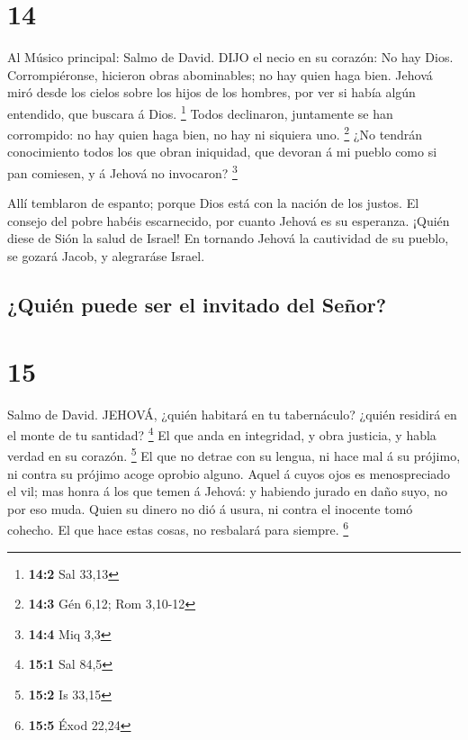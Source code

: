 \hypertarget{section-13}{%
\section{14}\label{section-13}}

 Al Músico principal: Salmo de David. DIJO el necio en su
corazón: No hay Dios. Corrompiéronse, hicieron obras abominables; no hay
quien haga bien.  Jehová miró desde los cielos sobre los
hijos de los hombres, por ver si había algún entendido, que buscara á
Dios. \footnote{\textbf{14:2} Sal 33,13}  Todos declinaron,
juntamente se han corrompido: no hay quien haga bien, no hay ni siquiera
uno. \footnote{\textbf{14:3} Gén 6,12; Rom 3,10-12}  ¿No
tendrán conocimiento todos los que obran iniquidad, que devoran á mi
pueblo como si pan comiesen, y á Jehová no invocaron? \footnote{\textbf{14:4}
  Miq 3,3}

 Allí temblaron de espanto; porque Dios está con la nación
de los justos.  El consejo del pobre habéis escarnecido, por
cuanto Jehová es su esperanza.  ¡Quién diese de Sión la
salud de Israel! En tornando Jehová la cautividad de su pueblo, se
gozará Jacob, y alegraráse Israel.

\hypertarget{quiuxe9n-puede-ser-el-invitado-del-seuxf1or}{%
\subsection{¿Quién puede ser el invitado del
Señor?}\label{quiuxe9n-puede-ser-el-invitado-del-seuxf1or}}

\hypertarget{section-14}{%
\section{15}\label{section-14}}

 Salmo de David. JEHOVÁ, ¿quién habitará en tu tabernáculo?
¿quién residirá en el monte de tu santidad? \footnote{\textbf{15:1} Sal
  84,5}  El que anda en integridad, y obra justicia, y habla
verdad en su corazón. \footnote{\textbf{15:2} Is 33,15}  El
que no detrae con su lengua, ni hace mal á su prójimo, ni contra su
prójimo acoge oprobio alguno.  Aquel á cuyos ojos es
menospreciado el vil; mas honra á los que temen á Jehová: y habiendo
jurado en daño suyo, no por eso muda.  Quien su dinero no
dió á usura, ni contra el inocente tomó cohecho. El que hace estas
cosas, no resbalará para siempre. \footnote{\textbf{15:5} Éxod 22,24}

